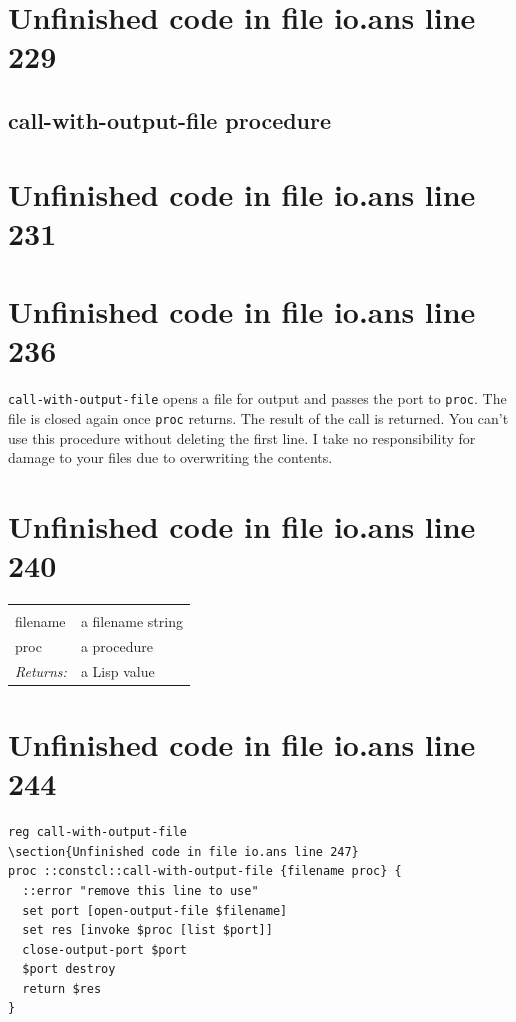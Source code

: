 \documentclass[twoside,9pt]{report}
\begin{document}
\section{Unfinished code in file io.ans line 229}
\subsection{call-with-output-file procedure}
\label{call-with-output-file-procedure}
\section{Unfinished code in file io.ans line 231}

\section{Unfinished code in file io.ans line 236}

\texttt{call-with-output-file} opens a file for output and passes the port to \texttt{proc}. The file is closed again once \texttt{proc} returns. The result of the call is returned. You can't use this procedure without deleting the first line. I take no responsibility for damage to your files due to overwriting the contents.

\section{Unfinished code in file io.ans line 240}
\noindent\begin{tabular}{ |p{1.9cm} p{8cm}| }
\hline
\rowcolor[HTML]{CCCCCC} \multicolumn{2}{|l|}{\bf call-with-output-file (public)} \\
filename & a filename string \\
proc & a procedure \\
\textit{Returns:} & a Lisp value \\
\hline
\end{tabular}
\section{Unfinished code in file io.ans line 244}
\begin{lstlisting}
reg call-with-output-file
\section{Unfinished code in file io.ans line 247}
proc ::constcl::call-with-output-file {filename proc} {
  ::error "remove this line to use"
  set port [open-output-file $filename]
  set res [invoke $proc [list $port]]
  close-output-port $port
  $port destroy
  return $res
}
\end{lstlisting}
\end{document}
